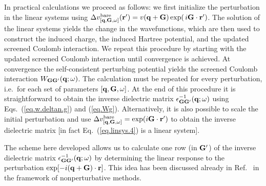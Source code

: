\documentclass[twocolumn,prb,showpacs,superscriptaddress]{revtex4}
\def\w{\omega}
\def\H{\hat{H}}
\def\P{\hat{P}_{\rm occ}}
\def\E{\varepsilon}
\def\q{{\bf q}}
\def\k{{\bf k}}
\def\G{{\bf G}}
\def\Gp{{\bf G^\prime}}
\def\r{{\bf r}}
\def\rp{{\bf r^\prime}}
\begin{document}
In practical calculations we proceed as follows: we first initialize the perturbation
in the linear systems using 
$\Delta v^{\rm bare}_{[\q,\G,\w]}(\rp) = v(\q+\G) \, {\rm exp}(\,i\G\cdot\rp)$.
The solution of the linear systems yields the change in the wavefunctions,
which are then used to construct the induced charge, the induced Hartree potential,
and the updated screened Coulomb interaction. We repeat this procedure by starting with
the updated screened Coulomb interaction until convergence is achieved.
At convergence the self-consistent perturbing potential yields
the screened Coulomb interaction $W_{\G\Gp}(\q;\w)$.
The calculation must be repeated for every perturbation, i.e.\ for
each set of parameters $[\q,\G,\w]$.
%
At the end of this procedure it is straightforward to obtain the inverse dielectric matrix 
$\epsilon^{-1}_{\G\Gp}(\q;\w)$ using Eqs.~(\ref{eq.w.deltan.g}) and 
(\ref{eq.Wg}). Alternatively, it is also possible to scale the initial
perturbation and use $\Delta v^{\rm bare}_{[\q,\G,\w]} = {\rm exp}(i\G\cdot\rp)$
to obtain the inverse dielectric matrix [in fact Eq.~(\ref{eq.linsys.4}) is a linear system].

The scheme here developed allows us to calculate one row (in $\Gp$) of the inverse 
dielectric matrix $\epsilon^{-1}_{\G\Gp}(\q;\w)$ by determining the linear response to the
perturbation ${\rm exp}[-i(\q+\G)\cdot\r]$. This idea has been discussed already
in Ref.\  in the framework of nonperturbative methods.

\end{document}
